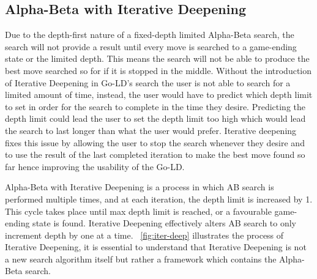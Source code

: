 \documentclass{l4proj}
\begin{document}
\subsection{Alpha-Beta with Iterative Deepening}

Due to the depth-first nature of a fixed-depth limited Alpha-Beta search, the search will not provide a result until every move is searched to a game-ending state or the limited depth. This means the search will not be able to produce the best move searched so for if it is stopped in the middle. Without the introduction of Iterative Deepening in Go-LD’s search the user is not able to search for a limited amount of time, instead, the user would have to predict which depth limit to set in order for the search to complete in the time they desire. Predicting the depth limit could lead the user to set the depth limit too high which would lead the search to last longer than what the user would prefer. Iterative deepening fixes this issue by allowing the user to stop the search whenever they desire and to use the result of the last completed iteration to make the best move found so far hence improving the usability of the Go-LD.

Alpha-Beta with Iterative Deepening is a process in which AB search is performed multiple times, and at each iteration, the depth limit is increased by 1. This cycle takes place until max depth limit is reached, or a favourable game-ending state is found. Iterative Deepening effectively alters AB search to only increment depth by one at a time.  ~\autoref{fig:iter-deep} illustrates the process of Iterative Deepening, it is essential to understand that Iterative Deepening is not a new search algorithm itself but rather a framework which contains the Alpha-Beta search.
\end{document}
